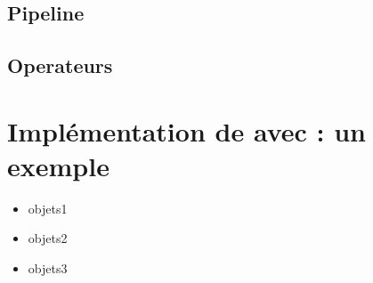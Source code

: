 \subsection{Pipeline}
\subsection{Operateurs}


\section{Impl\'ementation de  avec  : un exemple}


\begin{itemize}

\item objets1 

\item objets2 

\item objets3 


\end{itemize}
